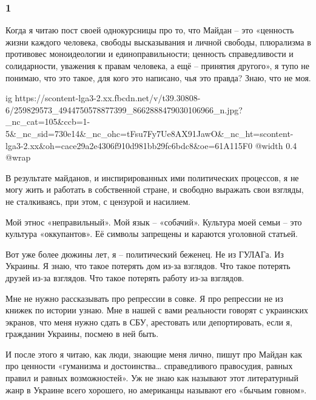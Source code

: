  
 
 
 
 

\subsubsection{1}
\label{sec:22_11_2021.fb.uljanov_anatolij.1.maidan.1}

Когда я читаю пост своей однокурсницы про то, что Майдан – это «ценность жизни
каждого человека, свободы высказывания и личной свободы, плюрализма в
противовес моноидеологии и единоправильности; ценность справедливости и
солидарности, уважения к правам человека, а ещё – принятия другого», я тупо не
понимаю, что это такое, для кого это написано, чья это правда? Знаю, что не
моя.

\ifcmt
  ig https://scontent-lga3-2.xx.fbcdn.net/v/t39.30808-6/259829573_4944750578877399_8662888479030106966_n.jpg?_nc_cat=105&ccb=1-5&_nc_sid=730e14&_nc_ohc=tFsu7Fy7Ue8AX91JawO&_nc_ht=scontent-lga3-2.xx&oh=cace29a2e4306f910d981bb29fc6bdc8&oe=61A115F0
  @width 0.4
  @wrap 
\fi

В результате майданов, и инспирированных ими политических процессов, я не могу
жить и работать в собственной стране, и свободно выражать свои взгляды, не
сталкиваясь, при этом, с цензурой и насилием.

Мой этнос «неправильный». Мой язык – «собачий». Культура моей семьи – это
культура «оккупантов». Её символы запрещены и караются уголовной статьей.

Вот уже более дюжины лет, я – политический беженец. Не из ГУЛАГа. Из Украины. Я
знаю, что такое потерять дом из-за взглядов. Что такое потерять друзей из-за
взглядов. Что такое потерять работу из-за взглядов. 

Мне не нужно рассказывать про репрессии в совке. Я про репрессии не из книжек
по истории узнаю. Мне в нашей с вами реальности говорят с украинских экранов,
что меня нужно сдать в СБУ, арестовать или депортировать, если я, гражданин
Украины, посмею в ней быть. 

И после этого я читаю, как люди, знающие меня лично, пишут про Майдан как про
ценности «гуманизма и достоинства… справедливого правосудия, равных правил и
равных возможностей». Уж не знаю как называют этот литературный жанр в Украине
всего хорошего, но американцы называют его «бычьим говном».  


